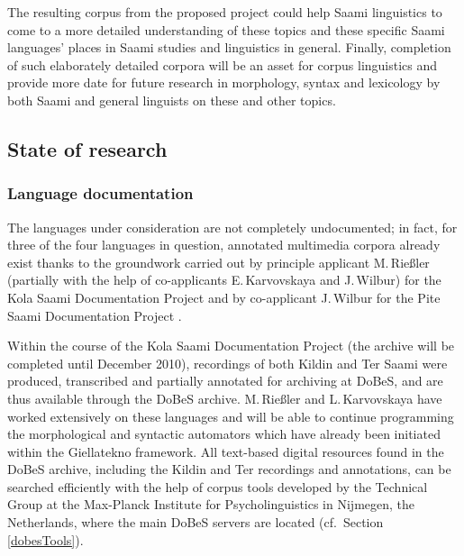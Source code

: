 \documentclass[a4paper,12pt]{article}
\begin{document}
The resulting corpus from the proposed project could help Saami linguistics to come to a more detailed understanding of these topics and these specific Saami languages' places in Saami studies and linguistics in general. Finally, completion of such elaborately detailed corpora will be an asset for corpus linguistics and provide more date for future research in morphology, syntax and lexicology by both Saami and general linguists on these and other topics.

\subsection{State of research}
\subsubsection{Language documentation}%

The languages under consideration are not completely undocumented; in fact, for three of the four languages in question, annotated multimedia corpora already exist thanks to the groundwork carried out by principle applicant M.\,Rießler (partially with the help of co-applicants E.\,Karvovskaya and J.\,Wilbur) for the Kola Saami Documentation Project \cite[a DoBeS project, cf.][]{KSDP} and by co-applicant J.\,Wilbur for the Pite Saami Documentation Project \cite[a Hans Rausing Endangered Languages Project, cf.][]{PSDP}.

Within the course of the Kola Saami Documentation Project (the archive will be completed until December 2010), recordings of both Kildin and Ter Saami were produced, transcribed and partially annotated for archiving at DoBeS, and are thus available through the DoBeS archive. M.\,Rießler and L.\,Karvovskaya have worked extensively on these languages and will be able to continue programming the morphological and syntactic automators which have already been initiated within the Giellatekno framework. All text-based digital resources found in the DoBeS archive, including the Kildin and Ter recordings and annotations, can be searched efficiently with the help of corpus tools developed by the Technical Group at the Max-Planck Institute for Psycholinguistics in Nijmegen, the Netherlands, where the main DoBeS servers are located (cf.~Section \ref{dobesTools}).
\end{document}
